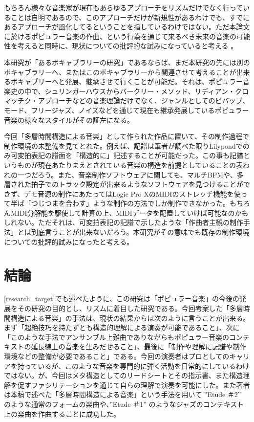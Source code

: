 \documentclass[uplatex,dvipdfmx]{ujarticle}
\begin{document}
もちろん様々な音楽家が現在もあらゆるアプローチをリズムだけでなく行っていることは自明であるので、このアプローチだけが新規性があるわけでも、すでにあるアプローチが風化してるということを指しているわけではない。ただ本論文に於けるポピュラー音楽の作曲、という行為を通じて来るべき未来の音楽の可能性を考えると同時に、現状についての批評的な試みになっていると考える
。

本研究が「あるボキャブラリーの研究」であるならば、まだ本研究の先には別のボキャブラリーへ、またはこのボキャブラリーから関連させて考えることが出来るボキャブリーへと発展、継承させて行くことが可能だ。それは、ポピュラー音楽史の中で、シュリンガーハウスからバークリー・メソッド、リディアン・クロマッチク・アプローチなどの音楽理論だけでなく、ジャンルとしてのビバップ、モード、フリージャズ、ノイズなどを通じて現在も継承発展しているポピュラー音楽の様々なスタイルがその証左になる。

今回「多層時間構造による音楽」として作られた作品に置いて、その制作過程で制作環境の未整備を見てとれた。例えば、記譜は筆者が調べた限りLilypondでのみ可変拍表記の譜面を「構造的に」記述することが可能だった。この事も記譜というものが現在あたりまえとされている音楽の構造を前提としていることの表われの一つだろう。また、音楽制作ソフトウェアに関しても、マルチBPMや、多層された拍子でのトラック設定が出来るようなソフトウェアを見つけることができず、デモ音源の制作にあたってはLogic Pro XのMIDIのストレッチ機能を使って半ば「つじつまを合わす」ような制作の方法でしか制作できなかった。もちろんMIDI分解能を駆使して計算の上、MIDIデータを配置していけば可能なのかもしれない。ただそれは、可変拍表記の記譜で示したような「作曲者主観の制作手法」とは到底言うことが出来ないだろう。本研究がその意味でも既存の制作環境についての批評的試みになったと考える。

\section{結論}

\ref{research_target}でも述べたように、この研究は「ポピュラー音楽」の今後の発展をその研究の目的とし、リズムに着目した研究である。今回考案した「多層時間構造による音楽」の手法は、現状の結果からは次のように言うことが出来る。まず「超絶技巧を持たずとも構造的理解による演奏が可能であること」、次に「このような手法でアンサンブル上難曲でありながらもポピュラー音楽のコンテキストの延長線上の音楽を生みだせること」、最後に「制作や理解に記譜や制作環境などの整備が必要であること」である。今回の演奏者はプロとしてのキャリアを持っているが、このような音楽を専門的に弾く活動を日常的にしているわけではない。が、今回はメタ構造としてのリードシートとその指示書、また構造理解を促すファシリテーションを通じて自らの理解で演奏を可能にした。また著者は本稿で述べた「多層時間構造による音楽」という手法を用いて ''Etude ＃2'' のような通常のフォームの楽曲や、''Etude ＃1'' のようなジャズのコンテキスト上の楽曲を作曲することに成功した。
\end{document}
